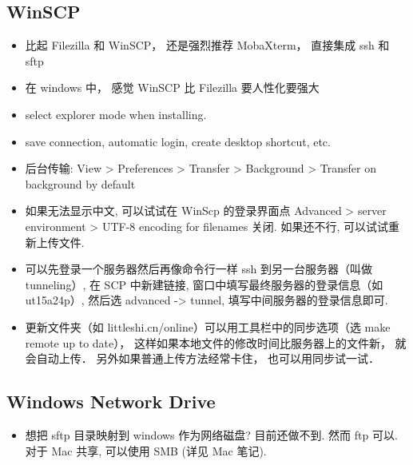 \subsection{WinSCP}
\begin{itemize}
\item 比起 Filezilla 和 WinSCP， 还是强烈推荐 MobaXterm， 直接集成 ssh 和 sftp
\item 在 windows 中， 感觉 WinSCP 比 Filezilla 要人性化要强大
\item select explorer mode when installing.
\item save connection, automatic login, create desktop shortcut, etc.
\item 后台传输: View > Preferences > Transfer > Background > Transfer on background by default
\item 如果无法显示中文, 可以试试在 WinScp 的登录界面点 Advanced > server environment > UTF-8 encoding for filenames 关闭. 如果还不行, 可以试试重新上传文件.
\item 可以先登录一个服务器然后再像命令行一样 ssh 到另一台服务器（叫做 tunneling）, 在 SCP 中新建链接, 窗口中填写最终服务器的登录信息（如 ut15a24p）, 然后选 advanced -> tunnel, 填写中间服务器的登录信息即可.
\item 更新文件夹（如 littleshi.cn/online）可以用工具栏中的同步选项（选 make remote up to date）， 这样如果本地文件的修改时间比服务器上的文件新， 就会自动上传． 另外如果普通上传方法经常卡住， 也可以用同步试一试．
\end{itemize}

\subsection{Windows Network Drive}
\begin{itemize}
\item 想把 sftp 目录映射到 windows 作为网络磁盘? 目前还做不到. 然而 ftp 可以. 对于 Mac 共享, 可以使用 SMB (详见 Mac 笔记).
\end{itemize}

